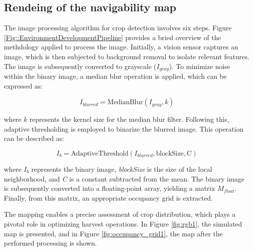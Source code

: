 \documentclass[conference]{IEEEtran}
\begin{document}
\subsection{Rendeing of the navigability map}
The image processing algorithm for crop detection involves six steps. Figure \ref{Fig::EnvironmentDevelopmentPipeline} provides a bried overview of the methdology applied to process the image. Initially, a vision sensor captures an image, which is then subjected to background removal to isolate relevant features. The image is subsequently converted to grayscale ($I_{gray}$). To minimize noise within the binary image, a median blur operation is applied, which can be expressed as:


\begin{equation}
I_{blurred} = \text{MedianBlur}(I_{gray}, k)
\end{equation}

where $k$ represents the kernel size for the median blur filter. Following this, adaptive thresholding is employed to binarize the blurred image. This operation can be described as:

\begin{equation}
I_{b} = \text{AdaptiveThreshold}(I_{blurred}, \text{blockSize}, \text{C})
\end{equation}

where $I_{b}$ represents the binary image, \textit{blockSize} is the size of the local neighborhood, and \textit{C} is a constant subtracted from the mean. The binary image is subsequently converted into a floating-point array, yielding a matrix $M_{float}$. Finally, from this matrix, an appropriate occupancy grid is extracted.

The mapping enables a precise assessment of crop distribution, which plays a pivotal role in optimizing harvest operations. In Figure \ref{fig:rgb1}, the simulated map is presented, and in Figure \ref{fig:occupancy_grid1}, the map after the performed processing is shown.
\end{document}
